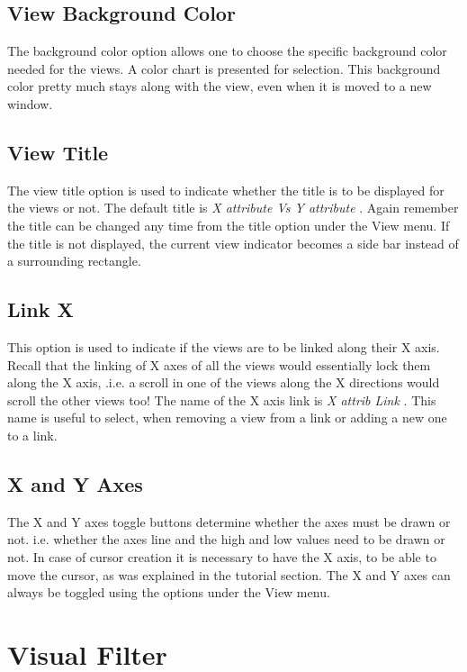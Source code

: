 \subsection{View Background Color}

The background color option allows one to choose the specific background color needed for the views.  A color chart is presented for selection. This background color pretty much stays along with the view, even when it is moved to a new window.

\subsection{View Title}

The view title option is used to indicate whether the title is to be displayed for the views or not. The default title is {\em X attribute Vs Y attribute } . Again remember the title can be changed any time from the title option under the View menu. If the title is not displayed, the current view indicator becomes a side bar instead of a surrounding rectangle.

\subsection{Link X}

This option is used to indicate if the views are to be linked along their X axis. Recall that the linking of X axes of all the views would essentially lock them along the X axis, .i.e. a scroll in one of the views along the X directions would scroll the other views too! The name of the X axis link is {\em X attrib Link } . This name is useful to select, when removing a view from a link or adding a new one to a link.

\subsection{X and Y Axes}

The X and Y axes toggle buttons determine whether the axes must be drawn or not. i.e. whether the axes line and the high and low values need to be drawn or not. In case of cursor creation it is necessary to have the X axis, to be able to move the cursor, as was explained in the tutorial section. The X and Y axes can always be toggled using the options under the View menu.

\section{Visual Filter}

